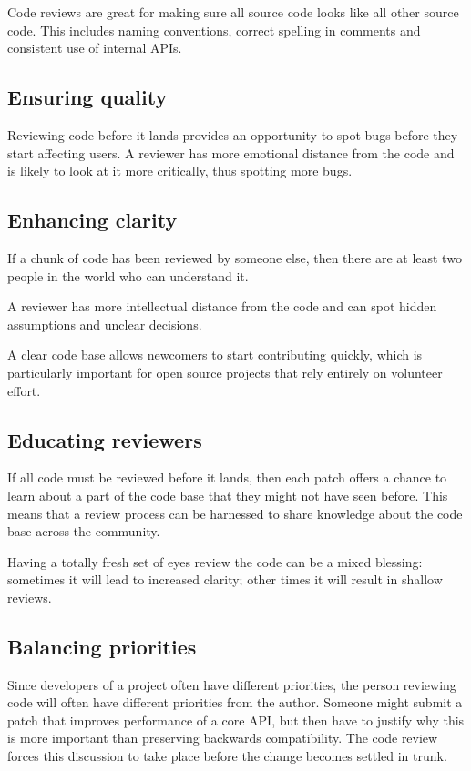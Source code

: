 \documentclass{article}
\begin{document}
Code reviews are great for making sure all source code looks like all other source code. This includes naming conventions, correct spelling in comments and consistent use of internal APIs. 

\subsection{Ensuring quality}

Reviewing code before it lands provides an opportunity to spot bugs before they start affecting users. A reviewer has more emotional distance from the code and is likely to look at it more critically, thus spotting more bugs. 

\subsection{Enhancing clarity}

If a chunk of code has been reviewed by someone else, then there are at least two people in the world who can understand it.

A reviewer has more intellectual distance from the code and can spot hidden assumptions and unclear decisions.

A clear code base allows newcomers to start contributing quickly, which is particularly important for open source projects that rely entirely on volunteer effort. 

\subsection{Educating reviewers}

If all code must be reviewed before it lands, then each patch offers a chance to learn about a part of the code base that they might not have seen before. This means that a review process can be harnessed to share knowledge about the code base across the community.

Having a totally fresh set of eyes review the code can be a mixed blessing: sometimes it will lead to increased clarity; other times it will result in shallow reviews. 

\subsection{Balancing priorities}

Since developers of a project often have different priorities, the person reviewing code will often have different priorities from the author. Someone might submit a patch that improves performance of a core API, but then have to justify why this is more important than preserving backwards compatibility. The code review forces this discussion to take place before the change becomes settled in trunk. 
\end{document}
